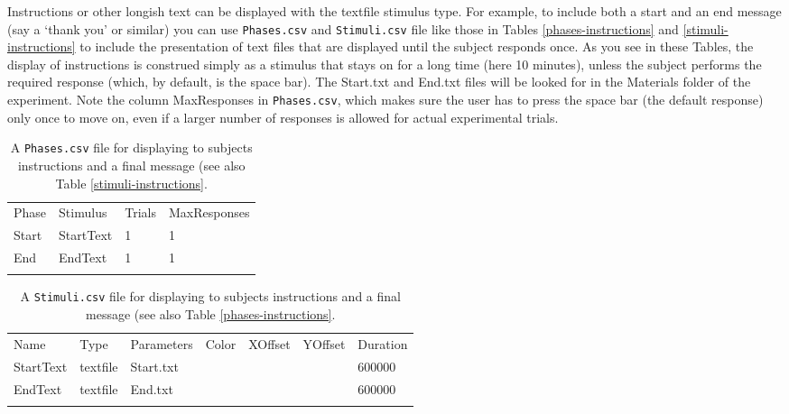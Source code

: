 \documentclass[11pt,]{article}
\renewcommand{\medskip}{}
\begin{document}
Instructions or other longish text can be displayed with the textfile
stimulus type. For example, to include both a start and an end message
(say a `thank you' or similar) you can use \texttt{Phases.csv} and
\texttt{Stimuli.csv} file like those in Tables \ref{phases-instructions}
and \ref{stimuli-instructions} to include the presentation of text files
that are displayed until the subject responds once. As you see in these
Tables, the display of instructions is construed simply as a stimulus
that stays on for a long time (here 10 minutes), unless the subject
performs the required response (which, by default, is the space bar).
The Start.txt and End.txt files will be looked for in the Materials
folder of the experiment. Note the column MaxResponses in
\texttt{Phases.csv}, which makes sure the user has to press the space
bar (the default response) only once to move on, even if a larger number
of responses is allowed for actual experimental trials.

\begin{table*}[t]\begin{center}\small\begin{tabular}{@{}llll@{}}
\hline\noalign{\medskip}
Phase & Stimulus & Trials & MaxResponses
\\\noalign{\medskip}
\hline\noalign{\medskip}
Start & StartText & 1 & 1
\\\noalign{\medskip}
End & EndText & 1 & 1
\\\noalign{\medskip}
\hline
\noalign{\medskip}
\end{tabular}\caption{A \texttt{Phases.csv} file for displaying to subjects
instructions and a final message (see also Table
\ref{stimuli-instructions}.}
\end{center}\end{table*}

\begin{table*}[t]\begin{center}\small\begin{tabular}{@{}lllllll@{}}
\hline\noalign{\medskip}
Name & Type & Parameters & Color & XOffset & YOffset & Duration
\\\noalign{\medskip}
\hline\noalign{\medskip}
StartText & textfile & Start.txt & & & & 600000
\\\noalign{\medskip}
EndText & textfile & End.txt & & & & 600000
\\\noalign{\medskip}
\hline
\noalign{\medskip}
\end{tabular}\caption{A \texttt{Stimuli.csv} file for displaying to subjects
instructions and a final message (see also Table
\ref{phases-instructions}.}
\end{center}\end{table*}
\end{document}
